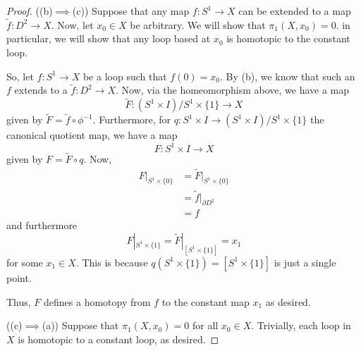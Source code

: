 \documentclass[fontsize=11pt]{scrartcl} %
\numberwithin{equation}{section} %
\numberwithin{figure}{section} %
\numberwithin{table}{section} %
\begin{document}
\begin{proof}
    ((b)$\implies$(c))
    Suppose that any map $f:S^1\to X$ can be extended to a map $\tilde{f}:D^2\to
    X$. Now, let $x_0\in X$ be arbitrary. We will show that $\pi_1(X,x_0)=0$. in
    particular, we will show that any loop based at $x_0$ is homotopic to the
    constant loop.

    So, let $f:S^1\to X$ be a loop such that $f(0) = x_0$. By (b), we know that
    such an $f$ extends to a $\tilde{f}:D^2\to X$. Now, via the homeomorphism
    above, we have a map 
    \[
        \tilde{F}:(S^1\times I)/{S^1\times \{1\}}\to X
    \]
    given by $\tilde{F} = \tilde{f}\circ\phi^{-1}$. Furthermore, for
    $q:S^1\times I\to (S^1\times I)/{S^1\times\{1\}}$ the canonical quotient
    map, we have a map
    \[
        F:S^1\times I\to X
    \]
    given by $F = \tilde{F}\circ q$. Now, 
    \[
        \begin{aligned}
            F|_{S^1\times\{0\}} &= \tilde{F}|_{S^1\times\{0\}}\\
            &= \tilde{f}|_{\partial D^2}\\
            &= f
        \end{aligned}
    \]
    and furthermore
    \[
        F|_{S^1\times\{1\}} = \tilde{F}|_{[S^1\times\{1\}]} = x_1
    \]
    for some $x_1\in X$. This is because $q(S^1\times\{1\}) = [S^1\times\{1\}]$
    is just a single point.

    Thus, $F$ defines a homotopy from $f$ to the constant map $x_1$ as desired.

    ((c)$\implies$(a))
    Suppose that $\pi_1(X,x_0)=0$ for all $x_0\in X$. Trivially, each loop in
    $X$ is homotopic to a constant loop, as desired.
\end{proof}
\end{document}
